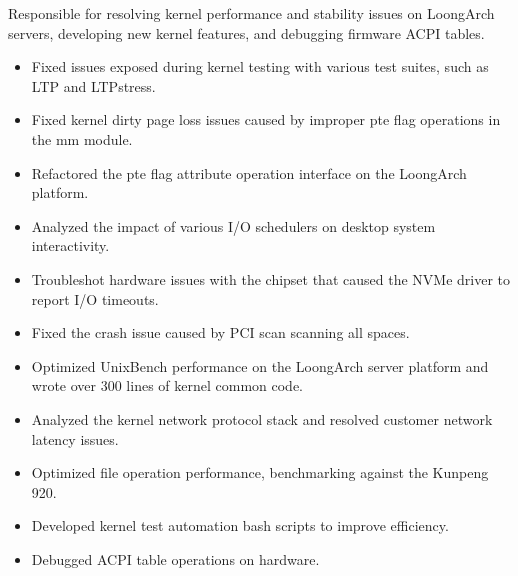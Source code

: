 \documentclass{resume}
\begin{document}
\begin{onehalfspacing}
Responsible for resolving kernel performance and stability issues on LoongArch servers, developing new kernel features, and debugging firmware ACPI tables.
\begin{itemize}
  \item Fixed issues exposed during kernel testing with various test suites, such as LTP and LTPstress.
  \item Fixed kernel dirty page loss issues caused by improper pte flag operations in the mm module.
  \item Refactored the pte flag attribute operation interface on the LoongArch platform.
  \item Analyzed the impact of various I/O schedulers on desktop system interactivity.
  \item Troubleshot hardware issues with the chipset that caused the NVMe driver to report I/O timeouts.
  \item Fixed the crash issue caused by PCI scan scanning all spaces.
  \item Optimized UnixBench performance on the LoongArch server platform and wrote over 300 lines of kernel common code.
  \item Analyzed the kernel network protocol stack and resolved customer network latency issues.
  \item Optimized file operation performance, benchmarking against the Kunpeng 920.
  \item Developed kernel test automation bash scripts to improve efficiency.
  \item Debugged ACPI table operations on hardware.
  \end{itemize}
\end{onehalfspacing}
\end{document}
